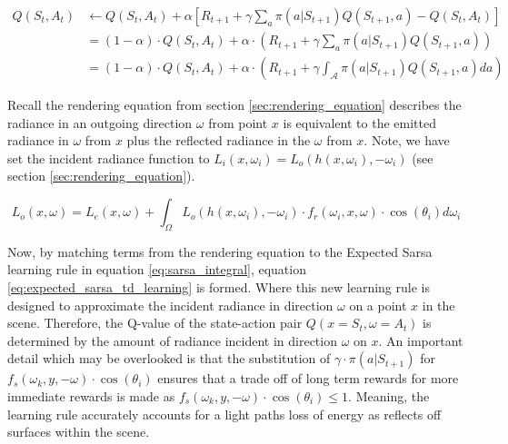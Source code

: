 \documentclass[../dissertation.tex]{subfiles}
\begin{document}
\begin{align}
Q(S_t, A_t) & \leftarrow Q(S_t, A_t) + \alpha [R_{t+1} + \gamma \sum_a \pi(a| S_{t+1}) Q(S_{t+1}, a) - Q(S_t, A_t)]\\
& =  (1 - \alpha) \cdot Q(S_{t},A_t) + \alpha \cdot \left( R_{t+1} + \gamma \sum_a \pi(a|S_{t+1}) Q(S_{t+1}, a) \right)\\
& = (1 - \alpha) \cdot Q(S_{t},A_t) + \alpha \cdot \left( R_{t+1} + \gamma \int_\mathcal{A} \pi(a|S_{t+1}) Q(S_{t+1}, a) da \right)
 \label{eq:sarsa_integral}
\end{align}

\noindent
Recall the rendering equation from section \ref{sec:rendering_equation} describes the radiance in an outgoing direction $\omega$ from point $x$ is equivalent to the emitted radiance in $\omega$ from $x$ plus the reflected radiance in the $\omega$ from $x$. Note, we have set the incident radiance function to $L_i(x, \omega_i) = L_o(h(x, \omega_i), -\omega_i)$ (see section \ref{sec:rendering_equation}).

\begin{equation}
L_o(x, \omega) = L_e(x,\omega)  + \int_\Omega L_o(h(x, \omega_i), -\omega_i)  \cdot f_r(\omega_i, x, \omega) \cdot \cos(\theta_i) d\omega_i \nonumber
\end{equation}

\noindent
Now, by matching  terms from the rendering equation to the Expected Sarsa learning rule in equation \ref{eq:sarsa_integral}, equation \ref{eq:expected_sarsa_td_learning} is formed. Where this new learning rule is designed to approximate the incident radiance in direction $\omega$ on a point $x$ in the scene. Therefore, the Q-value of the state-action pair $Q(x = S_t, \omega = A_t)$ is determined by the amount of radiance incident in direction $\omega$ on $x$. An important detail which may be overlooked is that the substitution of $\gamma \cdot \pi(a|S_{t+1})$ for $f_s(\omega_k, y, -\omega) \cdot \cos(\theta_i)$ ensures that a trade off of long term rewards for more immediate rewards is made as $f_s(\omega_k, y, -\omega) \cdot \cos(\theta_i) \leq 1$. Meaning, the learning rule accurately accounts for a light paths loss of energy as reflects off surfaces within the scene.
\end{document}
